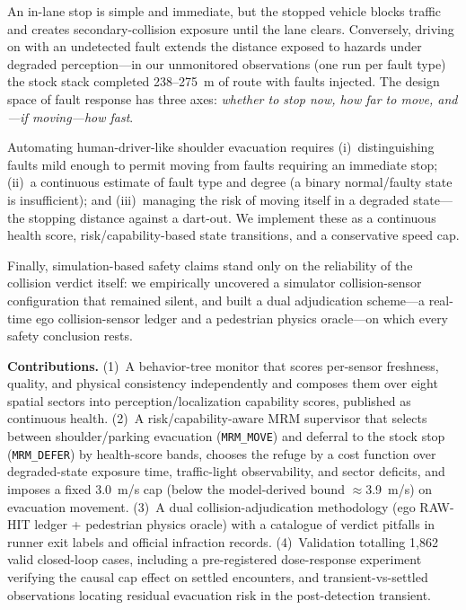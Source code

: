 \documentclass[letterpaper, 10pt, conference]{ieeeconf}
\begin{document}
An in-lane stop is simple and immediate, but the stopped vehicle blocks
traffic and creates secondary-collision exposure until the lane clears. Conversely, driving on with an undetected fault extends the distance
exposed to hazards under degraded perception---in our unmonitored
observations (one run per fault type) the stock stack completed 238--275~m
of route with faults injected. The design space of fault response has three axes: \emph{whether to stop
now, how far to move, and---if moving---how fast}.

Automating human-driver-like shoulder evacuation requires
(i)~distinguishing faults mild enough to permit moving from faults
requiring an immediate stop; (ii)~a continuous estimate of fault type and
degree (a binary normal/faulty state is insufficient); and (iii)~managing
the risk of moving itself in a degraded state---the stopping distance
against a dart-out. We implement these as a continuous health score,
risk/capability-based state transitions, and a conservative speed cap.

Finally, simulation-based safety claims stand only on the reliability of
the collision verdict itself: we empirically uncovered a simulator
collision-sensor configuration that remained silent, and built a dual
adjudication scheme---a real-time ego collision-sensor ledger and a
pedestrian physics oracle---on which every safety conclusion rests.

\textbf{Contributions.}
(1)~A behavior-tree monitor that scores per-sensor freshness, quality, and
physical consistency independently and composes them over eight spatial
sectors into perception/localization capability scores, published as
continuous health.
(2)~A risk/capability-aware MRM supervisor that selects between
shoulder/parking evacuation (\texttt{MRM\_MOVE}) and deferral to the stock
stop (\texttt{MRM\_DEFER}) by health-score bands, chooses the refuge by a
cost function over degraded-state exposure time, traffic-light
observability, and sector deficits, and imposes a fixed 3.0~m/s cap
(below the model-derived bound $\approx$3.9~m/s) on evacuation movement.
(3)~A dual collision-adjudication methodology (ego RAW-HIT ledger +
pedestrian physics oracle) with a catalogue of verdict pitfalls in runner
exit labels and official infraction records.
(4)~Validation totalling 1{,}862 valid closed-loop cases, including a
pre-registered dose-response experiment verifying the causal cap effect on
settled encounters, and transient-vs-settled observations locating
residual evacuation risk in the post-detection transient.
\end{document}
